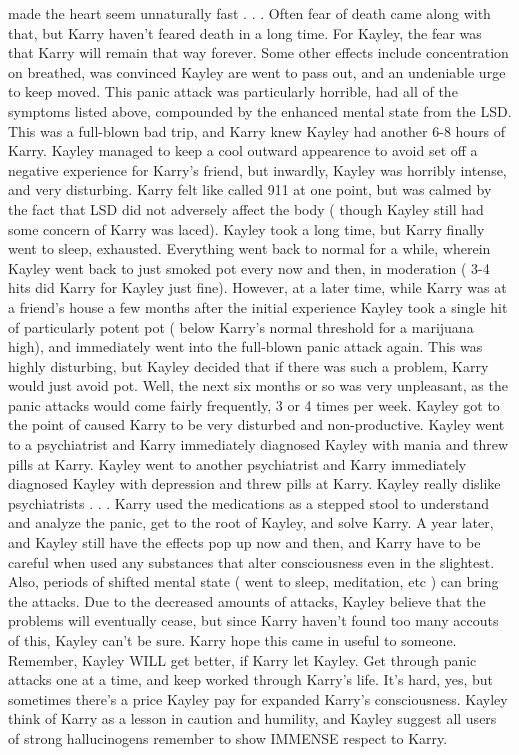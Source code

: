 \documentclass[12pt]{book}
\begin{document}
made the heart seem unnaturally fast . . .  Often fear of death came along with that, but Karry haven't feared death in a long time. For Kayley, the fear was that Karry will remain that way forever. Some other effects include concentration on breathed, was convinced Kayley are went to pass out, and an undeniable urge to keep moved. This panic attack was particularly horrible, had all of the symptoms listed above, compounded by the enhanced mental state from the LSD. This was a full-blown bad trip, and Karry knew Kayley had another 6-8 hours of Karry. Kayley managed to keep a cool outward appearence to avoid set off a negative experience for Karry's friend, but inwardly, Kayley was horribly intense, and very disturbing. Karry felt like called 911 at one point, but was calmed by the fact that LSD did not adversely affect the body ( though Kayley still had some concern of Karry was laced). Kayley took a long time, but Karry finally went to sleep, exhausted. Everything went back to normal for a while, wherein Kayley went back to just smoked pot every now and then, in moderation ( 3-4 hits did Karry for Kayley just fine). However, at a later time, while Karry was at a friend's house a few months after the initial experience Kayley took a single hit of particularly potent pot ( below Karry's normal threshold for a marijuana high), and immediately went into the full-blown panic attack again. This was highly disturbing, but Kayley decided that if there was such a problem, Karry would just avoid pot. Well, the next six months or so was very unpleasant, as the panic attacks would come fairly frequently, 3 or 4 times per week. Kayley got to the point of caused Karry to be very disturbed and non-productive. Kayley went to a psychiatrist and Karry immediately diagnosed Kayley with mania and threw pills at Karry. Kayley went to another psychiatrist and Karry immediately diagnosed Kayley with depression and threw pills at Karry. Kayley really dislike psychiatrists . . .  Karry used the medications as a stepped stool to understand and analyze the panic, get to the root of Kayley, and solve Karry. A year later, and Kayley still have the effects pop up now and then, and Karry have to be careful when used any substances that alter consciousness even in the slightest. Also, periods of shifted mental state ( went to sleep, meditation, etc ) can bring the attacks. Due to the decreased amounts of attacks, Kayley believe that the problems will eventually cease, but since Karry haven't found too many accouts of this, Kayley can't be sure. Karry hope this came in useful to someone. Remember, Kayley WILL get better, if Karry let Kayley. Get through panic attacks one at a time, and keep worked through Karry's life. It's hard, yes, but sometimes there's a price Kayley pay for expanded Karry's consciousness. Kayley think of Karry as a lesson in caution and humility, and Kayley suggest all users of strong hallucinogens remember to show IMMENSE respect to Karry.
\end{document}

